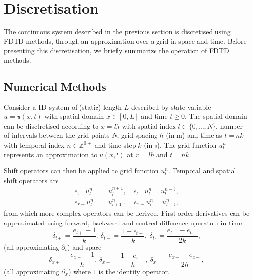 \section{Discretisation}\label{sec:discrete}
The continuous system described in the previous section is discretised using FDTD methods, through an approximation over a grid in space and time. Before presenting this discretisation, we briefly summarize the operation of FDTD methods.

\subsection{Numerical Methods}\label{sec:numMeth}
Consider a 1D system of (static) length $L$ described by state variable $u = u(x,t)$ with spatial domain $x\in [0, L]$ and time $t\geq 0$. The spatial domain can be disctretised according to $x=lh$ with spatial index $l \in \{0, \hdots, N\}$, number of intervals between the grid points $N$, grid spacing $h$ (in m) and time as $t=nk$ with temporal index $n \in \mathbb{Z}^{0+}$ and time step $k$ (in s). The grid function $u_l^n$ represents an approximation to $u(x,t)$ at $x=lh$ and $t=nk$. 

Shift operators can then be applied to grid function $u_l^n$. Temporal and spatial shift operators are
\begin{equation}
    \begin{aligned}
        e_{t+}u_l^n &= u_l^{n+1}, \quad e_{t-}u_l^n = u_l^{n-1},\\
        e_{x+}u_l^n &= u_{l+1}^n\;, \quad \!e_{x-}u_l^n = u_{l-1}^n,
    \end{aligned}
\end{equation}
from which more complex operators can be derived.
First-order derivatives can be approximated using forward, backward and centred difference operators in time
\begin{equation}\label{eq:discTimeOperators}
    \delta_{t+} = \frac{e_{t+} - 1}{k},\ \delta_{t-} = \frac{1 - e_{t-}}{k},\ \delta_{t\cdot} = \frac{e_{t+}-e_{t-}}{2k},
\end{equation}
(all approximating $\partial_t$) and space
\begin{equation}\label{eq:discSpaceOperators}
    \delta_{x+} = \frac{e_{x+} - 1}{h},\ \delta_{x-} = \frac{1 - e_{x-}}{h},\ \delta_{x\cdot} = \frac{e_{x+}-e_{x-}}{2h},
\end{equation} 
(all approximating $\partial_x$) where $1$ is the identity operator.

